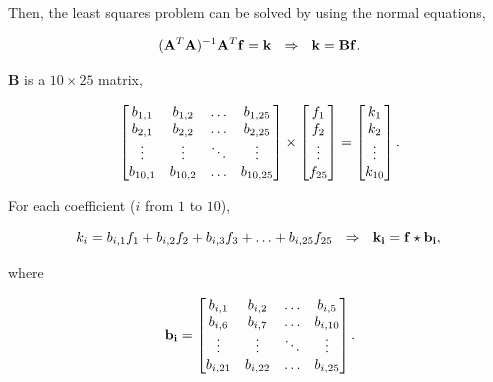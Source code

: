\documentclass{ipol}
\numberwithin{equation}{section}
\numberwithin{table}{section}
\numberwithin{figure}{section}
\begin{document}
Then, the least squares problem can be solved by using the normal equations,

\begin{equation*}
	(\mathbf{A}^T\mathbf{A})^{-1}\mathbf{A}^T\mathbf{f} = \mathbf{k} \ \ \Rightarrow \ \ \mathbf{k} = \mathbf{B}\mathbf{f} .\\
\end{equation*}

$\mathbf{B}$ is a $10\times25$ matrix, 

\begin{equation*}
	\begin{bmatrix}
		b_{1,1}		& b_{1,2}	& \hdots	& b_{1,25}	\\
		b_{2,1}		& b_{2,2}	& \hdots	& b_{2,25}	\\
		\vdots		& \vdots	& \ddots	& \vdots	\\
		b_{10,1}	& b_{10,2}	& \hdots	& b_{10,25}
	\end{bmatrix}
	\times
	\begin{bmatrix}
		f_1		\\
		f_2		\\
		\vdots	\\
		f_{25}
	\end{bmatrix}
	=
	\begin{bmatrix}
		k_1		\\
		k_2		\\
		\vdots	\\
		k_{10}
	\end{bmatrix} .\\
\end{equation*}

For each coefficient ($i$ from $1$ to $10$), 

\begin{equation}
	\label{eq:coefficients}
	k_i = b_{i,1}f_1 + b_{i,2}f_2 + b_{i,3}f_3 + \hdots + b_{i,25}f_{25} \ \ \Rightarrow \ \ \mathbf{k_i} = \mathbf{f}\star\mathbf{b_i},\\
\end{equation}

where

\begin{equation}
	\label{eq:b_i}
	\mathbf{b_i} = \begin{bmatrix}	b_{i,1}		& b_{i,2}	& \hdots	& b_{i,5}	\\
									b_{i,6}		& b_{i,7}	& \hdots	& b_{i,10}	\\
									\vdots		& \vdots	& \ddots	& \vdots	\\
									b_{i,21}	& b_{i,22}	& \hdots	& b_{i,25}	\\
					\end{bmatrix}.\\
\end{equation}
\end{document}
